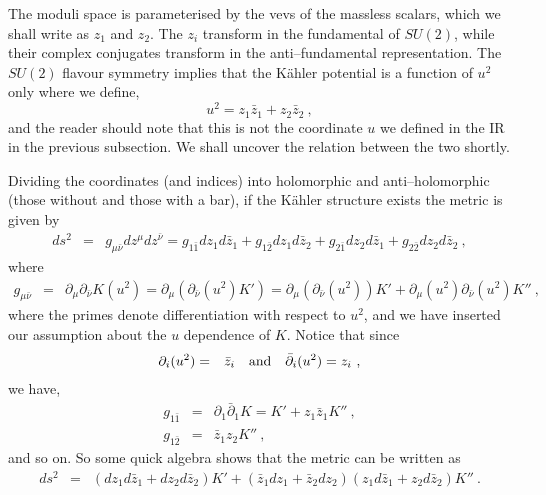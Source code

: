 \documentclass[a4paper,12pt]{article}
\begin{document}
\label{sec:general1}

The moduli space is parameterised by the vevs of the massless scalars,
which we shall write as $z_1$ and $z_2$.  The $z_i$ transform in the
fundamental of $SU(2)$, while their complex conjugates transform in
the anti--fundamental representation.  The $SU(2)$ flavour symmetry
implies that the K\"ahler potential is a function of $u^2$ only where
we define,
\begin{equation}
  u^2 = z_1 \bar{z}_1 + z_2 \bar{z}_2 \ ,
\end{equation}
and the reader should note that this is not the coordinate $u$ we
defined in the IR in the previous subsection. We shall uncover the
relation between the two shortly.

Dividing the coordinates (and indices) into holomorphic and
anti--holomorphic (those without and those with a bar), if the
K\"ahler structure exists the metric is given by
\begin{eqnarray}
  ds^2 & = & g_{\mu\bar{\nu}} dz^\mu dz^{\bar{\nu}} 
   =  g_{1\bar{1}} dz_1 d\bar{z}_1 + g_{1\bar{2}} dz_1 d\bar{z}_2 + g_{2\bar{1}} dz_2 d\bar{z}_1 + g_{2\bar{2}} dz_2 d\bar{z}_2\ ,
\end{eqnarray}
where
\begin{eqnarray}
  g_{\mu\bar{\nu}} & = & \partial_\mu \partial_{\bar{\nu}} K(u^2) 
   =  \partial_\mu (\partial_{\bar{\nu}} (u^2) K') 
   =  \partial_\mu (\partial_{\bar{\nu}} (u^2)) K' + \partial_\mu (u^2) \partial_{\bar{\nu}} (u^2) K'' \ ,
\end{eqnarray}
where the primes denote differentiation with respect to $u^2$, and we
have inserted our assumption about the $u$ dependence of $K$.  Notice
that since \begin{eqnarray} \partial_i (u^2) & = & \bar{z}_i \quad
  {\rm and} \quad \bar{\partial}_i (u^2) = z_i\ ,
\end{eqnarray}
we have, 
\begin{eqnarray}
  g_{1\bar{1}} & = & \partial_1 \bar{\partial}_1 K 
   =  K' + z_1 \bar{z}_1 K''\ , \nonumber\\
  g_{1\bar{2}} & = & \bar{z}_1 z_2 K''\ ,
\end{eqnarray}
and so on.  So some quick algebra shows that the metric can be written
as
\begin{eqnarray}
  ds^2 & = & (dz_1 d\bar{z}_1 + dz_2 d\bar{z}_2)K' 
   + (\bar{z}_1 dz_1 + \bar{z}_2 dz_2)(z_1 d\bar{z}_1 + z_2 d\bar{z}_2)K''\ .
\end{eqnarray}
\end{document}
